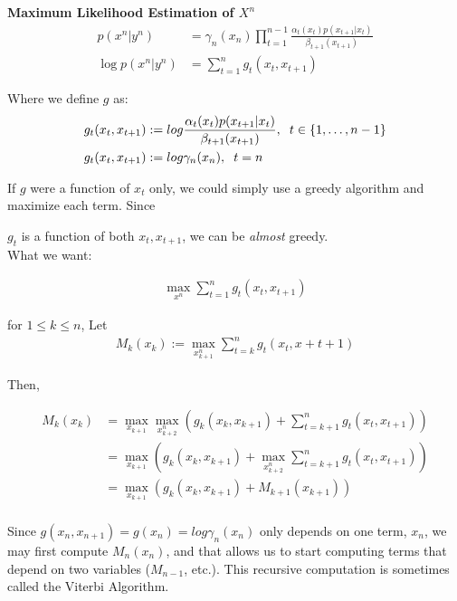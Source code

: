 \documentclass{article}
\begin{document}
	\textbf{Maximum Likelihood Estimation of $X^n$}
	\begin{align*}
		p(x^n | y^n) &= \gamma_n (x_n) \prod_{t=1}^{n-1} \frac{\alpha_t (x_t) p(x_{t+1} | x_t)}{\beta_{t+1} (x_{t+1})}\\
		\log p(x^n | y^n) &= \sum_{t = 1}^{n} g_t (x_t, x_{t+1})
	\end{align*}
	
	Where  we define $g$ as:
	\begin{align*}
		g_t(x_t, x_{t+1}) &:= log \frac{\alpha_t (x_t) p(x_{t+1} | x_t)}{\beta_{t+1}(x_{t+1})}, \hspace{2 mm} t \in \{1, \dots , n-1\}\\
		g_t(x_t, x_{t+1}) &:= log \gamma_n (x_n), \hspace{2 mm } t = n
	\end{align*}	
	
	
	If $g$ were a function of $x_t$ only, we could simply use a greedy algorithm and maximize each term. Since 
	
	$g_t$ is a function of both $x_t, x_{t+1}$, we can be \textit{almost} greedy.\\
	
	What we want:
	
	\begin{align*}
		\max_{x^n} \sum_{t=1}^{n} g_t (x_t , x_{t+1})
	\end{align*}
	
	\begin{definition}
		for $1 \leq k \leq n$, Let
		\begin{align*}
			M_k (x_k) := \max_{x_{k+1}^{n}} \sum_{t=k}^{n} g_t (x_t, x+{t+1})
		\end{align*}
	\end{definition}
	
	Then,
	
	\begin{align*}
		M_k (x_k) &= \max_{x_{k+1}} \max_{x_{k+2}^n} (g_k (x_k, x_{k+1}) + \sum_{t=k+1}^{n} g_t (x_t, x_{t+1}))\\
		&=  \max_{x_{k+1}}  (g_k (x_k, x_{k+1}) + \max_{x_{k+2}^{n}}  \sum_{t=k+1}^{n} g_t (x_t, x_{t+1})  ) \\
		&=  \max_{x_{k+1}}  (g_k (x_k, x_{k+1}) + M_{k+1}(x_{k+1}  ))\\ 
	\end{align*}
	
	Since $g(x_n,x_{n+1})=g(x_n)=log \gamma_n (x_n)$ only depends on one term, $x_n$, we may first compute $M_n(x_n)$, and that allows us to start computing terms that depend on two variables ($M_{n-1}$, etc.). This recursive computation is sometimes called the Viterbi Algorithm.
	
\end{document}
